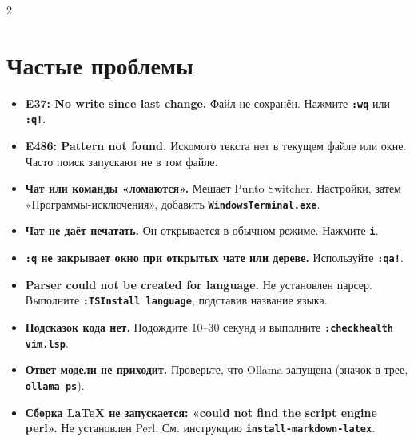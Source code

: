 \documentclass[10pt]{article}
\newcommand{\RU}{\selectlanguage{russian}}
\newcommand{\EN}{\selectlanguage{english}}
\newcommand{\key}[1]{\texttt{\bfseries #1}}
\begin{document}
\begin{paracol}{2}
\RU
\section*{Частые проблемы}
\begin{itemize}\setlength\itemsep{2pt}
\item \textbf{E37: No write since last change.} Файл не сохранён. Нажмите \key{:wq} или \key{:q!}.
\item \textbf{E486: Pattern not found.} Искомого текста нет в текущем файле или окне. Часто поиск запускают не в том файле.
\item \textbf{Чат или команды «ломаются».} Мешает Punto Switcher. Настройки, затем «Программы-исключения», добавить \key{WindowsTerminal.exe}.
\item \textbf{Чат не даёт печатать.} Он открывается в обычном режиме. Нажмите \key{i}.
\item \textbf{\key{:q} не закрывает окно при открытых чате или дереве.} Используйте \key{:qa!}.
\item \textbf{Parser could not be created for language.} Не установлен парсер. Выполните \key{:TSInstall language}, подставив название языка.
\item \textbf{Подсказок кода нет.} Подождите 10--30 секунд и выполните \key{:checkhealth vim.lsp}.
\item \textbf{Ответ модели не приходит.} Проверьте, что Ollama запущена (значок в трее, \key{ollama ps}).
\item \textbf{Сборка LaTeX не запускается: «could not find the script engine perl».} Не установлен Perl. См. инструкцию \key{install-markdown-latex}.
\end{itemize}
\switchcolumn
\EN

\end{paracol}
\end{document}
